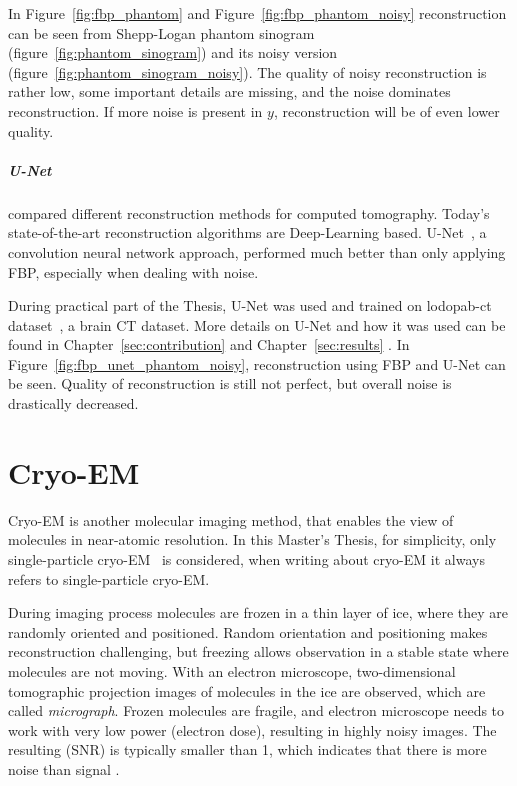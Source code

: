 In Figure~\ref{fig:fbp_phantom} and Figure~\ref{fig:fbp_phantom_noisy} reconstruction can be seen from 
Shepp-Logan phantom sinogram (figure~\ref{fig:phantom_sinogram}) and its noisy version (figure~\ref{fig:phantom_sinogram_noisy}).
The quality of noisy reconstruction is rather low, some important details are missing, and the noise dominates reconstruction.
If more noise is present in $y$, reconstruction will be of even lower quality.

\subparagraph{U-Net}
\citet{ct-reconstruction-comparison} compared different reconstruction methods for computed tomography. 
Today's state-of-the-art reconstruction algorithms are Deep-Learning based.
U-Net~\cite{unet-tomography}, a convolution neural network approach, performed
much better than only applying FBP, especially when dealing with noise.

During practical part of the Thesis, U-Net was used and trained on lodopab-ct dataset~\cite{lodopab-dataset}, a brain CT dataset. 
More details on U-Net and how it was used can be found in 
Chapter~\ref{sec:contribution} \textit{} and 
Chapter~\ref{sec:results} \textit{}.
In Figure~\ref{fig:fbp_unet_phantom_noisy}, reconstruction using FBP and U-Net can be seen.
Quality of reconstruction is still not perfect, but overall noise is drastically decreased.


\section{Cryo-EM}
Cryo-EM is another molecular imaging method, that enables the view of molecules in near-atomic resolution.
In this Master's Thesis, for simplicity, only single-particle cryo-EM~\cite{singleParticleCryoEm} is considered, 
when writing about cryo-EM it always refers to single-particle cryo-EM.

During imaging process molecules are frozen in a thin layer of ice, where they are randomly oriented and positioned. 
Random orientation and positioning makes reconstruction challenging, 
but freezing allows observation in a stable state where molecules are not moving.
With an electron microscope, two-dimensional tomographic projection images of molecules in the ice are observed,
which are called \textit{micrograph}. 
Frozen molecules are fragile, and electron microscope needs to work with
very low power (electron dose), resulting in highly noisy images. The resulting (SNR)
is typically smaller than 1, which indicates that there is more noise than signal \cite{cryoEmMath2}.

